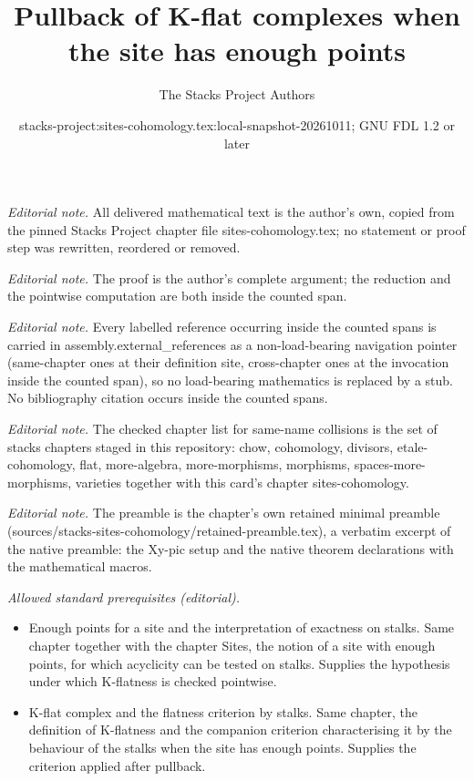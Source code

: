 \documentclass[10pt,a4paper]{amsart}
\title{Pullback of K-flat complexes when the site has enough points}
\author{The Stacks Project Authors}
\date{stacks-project:sites-cohomology.tex:local-snapshot-20261011; GNU FDL 1.2 or later}
\theoremstyle{plain}
\theoremstyle{definition}
\theoremstyle{remark}
\numberwithin{equation}{subsection}
\begin{document}
\maketitle
\noindent\textit{Editorial note.} All delivered mathematical text is the author's own, copied from the pinned Stacks Project chapter file sites-cohomology.tex; no statement or proof step was rewritten, reordered or removed.\par\medskip
\noindent\textit{Editorial note.} The proof is the author's complete argument; the reduction and the pointwise computation are both inside the counted span.\par\medskip
\noindent\textit{Editorial note.} Every labelled reference occurring inside the counted spans is carried in assembly.external\_references as a non-load-bearing navigation pointer (same-chapter ones at their definition site, cross-chapter ones at the invocation inside the counted span), so no load-bearing mathematics is replaced by a stub. No bibliography citation occurs inside the counted spans.\par\medskip
\noindent\textit{Editorial note.} The checked chapter list for same-name collisions is the set of stacks chapters staged in this repository: chow, cohomology, divisors, etale-cohomology, flat, more-algebra, more-morphisms, morphisms, spaces-more-morphisms, varieties together with this card's chapter sites-cohomology.\par\medskip
\noindent\textit{Editorial note.} The preamble is the chapter's own retained minimal preamble (sources/stacks-sites-cohomology/retained-preamble.tex), a verbatim excerpt of the native preamble: the Xy-pic setup and the native theorem declarations with the mathematical macros.\par\medskip
\noindent\textit{Allowed standard prerequisites (editorial).}\begin{itemize}
\item Enough points for a site and the interpretation of exactness on stalks. Same chapter together with the chapter Sites, the notion of a site with enough points, for which acyclicity can be tested on stalks. Supplies the hypothesis under which K-flatness is checked pointwise.
\item K-flat complex and the flatness criterion by stalks. Same chapter, the definition of K-flatness and the companion criterion characterising it by the behaviour of the stalks when the site has enough points. Supplies the criterion applied after pullback.
\end{itemize}\medskip
\end{document}
